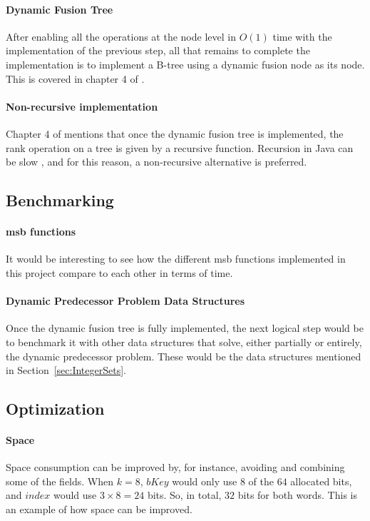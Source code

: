 \paragraph*{Dynamic Fusion Tree}
After enabling all the operations at the node level in $O(1)$ time with the implementation of the previous step, all that remains to complete the implementation is to implement a B-tree using a dynamic fusion node as its node. This is covered in chapter 4 of \cite{patrascu2014dynamic}.

\paragraph*{Non-recursive implementation}
Chapter 4 of \cite{patrascu2014dynamic} mentions that once the dynamic fusion tree is implemented, the rank operation on a tree is given by a recursive function. Recursion in Java can be slow \cite{shirazi2003java}, and for this reason, a non-recursive alternative is preferred.


\subsection{Benchmarking}

\paragraph*{msb functions}
It would be interesting to see how the different msb functions implemented in this project compare to each other in terms of time.

\paragraph*{Dynamic Predecessor Problem Data Structures}
Once the dynamic fusion tree is fully implemented, the next logical step would be to benchmark it with other data structures that solve, either partially or entirely, the dynamic predecessor problem. These would be the data structures mentioned in Section~\ref{sec:IntegerSets}.

\subsection{Optimization}

\paragraph*{Space}
Space consumption can be improved by, for instance, avoiding and combining some of the fields. When $k = 8$, $bKey$ would only use $8$ of the $64$ allocated bits, and $index$ would use $3 \times 8 = 24$ bits. So, in total, $32$ bits for both words. This is an example of how space can be improved.

